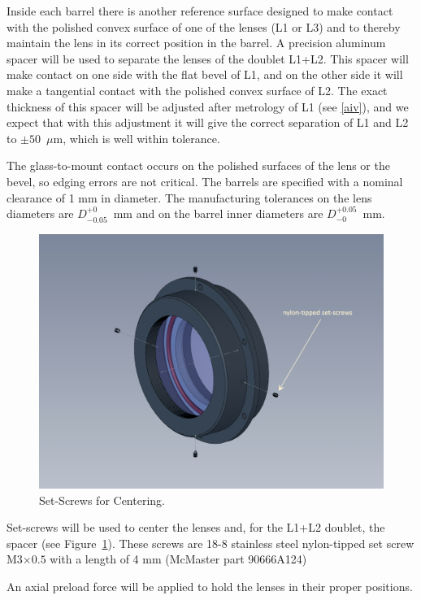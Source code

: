 \documentclass{article}
\newcommand{\micron}{\mbox{$\mu$m}}
\begin{document}
Inside each barrel there is another reference surface designed to make contact with the polished convex surface of one of the lenses (L1 or L3) and to thereby maintain the lens in its correct position in the barrel. A precision aluminum spacer will be used to separate the lenses of the doublet L1+L2. This spacer will make contact on one side with the flat bevel of L1, and on the other side it will make a tangential contact with the polished convex surface of L2. The exact thickness of this spacer will be adjusted after metrology of L1 (see \ref{aiv}), and we expect that with this adjustment it will give the correct separation of L1 and L2 to $\pm50$~{\micron}, which is well within tolerance.

The glass-to-mount contact occurs on the polished surfaces of the lens or the bevel, so edging errors are not critical. The barrels are specified with a nominal clearance of 1 mm in diameter. The manufacturing tolerances on the lens diameters are $D^{+0}_{-0.05}$~mm and on the barrel inner diameters are $D_{-0}^{+0.05}$~mm.

\begin{figure}
\begin{center}
\includegraphics[width=0.7\linewidth]{figures/rosalia-set-screws.png}
\end{center}
\caption{Set-Screws for Centering.}
\label{figure:rosalia-set-screws}
\end{figure}

Set-screws will be used to center the lenses and, for the L1+L2 doublet, the spacer (see Figure~\ref{figure:rosalia-set-screws}). These screws are 18-8 stainless steel nylon-tipped set screw M3$ \times 0.5$ with a length of 4 mm (McMaster part 90666A124)

An axial preload force will be applied to hold the lenses in their proper positions. 
\end{document}
